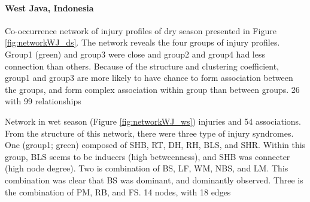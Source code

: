 \paragraph{West Java, Indonesia}

Co-occurrence network of injury profiles of dry season presented in Figure \ref{fig:networkWJ_ds}. The network reveals the four groups of injury profiles. Group1 (green) and group3 were close and group2 and group4 had less connection than others. Because of the structure and clustering coefficient, group1 and group3 are more likely to have chance to form association between the groups, and form complex association within group than between groups. 26 with 99 relationships

Network in wet season (Figure \ref{fig:networkWJ_ws}) injuries and 54 associations. From the structure of this network, there were three type of injury syndromes.  One (group1; green) composed of SHB, RT, DH, RH, BLS, and SHR.  Within this group, BLS seems to be inducers (high betweenness), and SHB was connecter (high node degree). Two is combination of BS, LF, WM, NBS, and LM. This combination was clear that BS was dominant, and dominantly observed. Three is the combination of PM, RB, and FS.  14 nodes, with 18 edges

